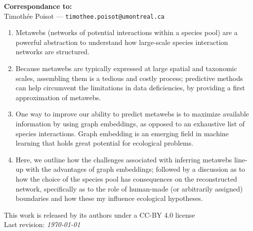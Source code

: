 \documentclass[11pt]{article}
\begin{document}
\textbf{Correspondance to:}\\
Timothée Poisot --- \texttt{timothee.poisot@umontreal.ca}\\

\vfill


\begin{enumerate}
    \item Metawebs (networks of potential interactions within a species
pool) are a powerful abstraction to understand how large-scale species
interaction networks are structured.%
    \item Because metawebs are typically expressed at large spatial and
taxonomic scales, assembling them is a tedious and costly process;
predictive methods can help circumvent the limitations in data
deficiencies, by providing a first approximation of metawebs.%
    \item One way to improve our ability to predict metawebs is to
maximize available information by using graph embeddings, as opposed to
an exhaustive list of species interactions. Graph embedding is an
emerging field in machine learning that holds great potential for
ecological problems.%
    \item Here, we outline how the challenges associated with inferring
metawebs line-up with the advantages of graph embeddings; followed by a
discussion as to how the choice of the species pool has consequences on
the reconstructed network, specifically as to the role of human-made (or
arbitrarily assigned) boundaries and how these my influence ecological
hypotheses.%
\end{enumerate}



\vfill
This work is released by its authors under a CC-BY 4.0 license\hfill\ccby\\
Last revision: \emph{\today}

\clearpage
\thispagestyle{empty}

\vfill

\vfill

\clearpage
\linenumbers
\pagestyle{normal}
\end{document}
